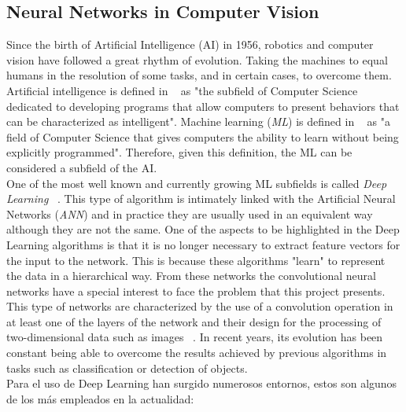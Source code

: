 \documentclass{bmvc2k}
\begin{document}
\subsection{Neural Networks in Computer Vision}
Since the birth of Artificial Intelligence (AI) in 1956, robotics and computer vision have followed a great rhythm of evolution. Taking the machines to equal humans in the resolution of some tasks, and in certain cases, to overcome them.
Artificial intelligence is defined in ~\cite{mccarthy2006proposal} as "the subfield of Computer Science dedicated to developing programs that allow computers to present behaviors that can be characterized as intelligent". Machine learning (\textit{ML}) is defined in ~\cite{samuel2000some} as "a field of Computer Science that gives computers the ability to learn without being explicitly programmed". Therefore, given this definition, the ML can be considered a subfield of the AI.\\
One of the most well known and currently growing ML subfields is called \textit{Deep Learning} ~\cite{deng2014deep}. This type of algorithm is intimately linked with the Artificial Neural Networks (\textit{ANN}) and in practice they are usually used in an equivalent way although they are not the same. One of the aspects to be highlighted in the Deep Learning algorithms is that it is no longer necessary to extract feature vectors for the input to the network. This is because these algorithms "learn" to represent the data in a hierarchical way. From these networks the convolutional neural networks have a special interest to face the problem that this project presents. This type of networks are characterized by the use of a convolution operation in at least one of the layers of the network and their design for the processing of two-dimensional data such as images ~\cite{liu2015implementation}. In recent years, its evolution has been constant being able to overcome the results achieved by previous algorithms in tasks such as classification or detection of objects.\\
Para el uso de Deep Learning han surgido numerosos entornos, estos son algunos de los más empleados en la actualidad:
\end{document}
